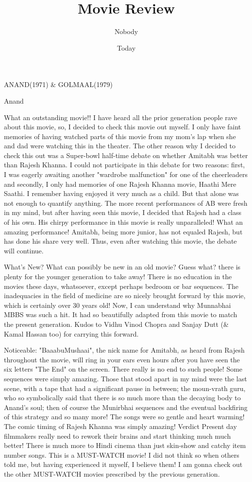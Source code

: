 \documentclass{article}
\title{Movie Review}
\author{Nobody}
\date{Today}
\begin{document}
\maketitle

\LARGE{ANAND(1971) \& GOLMAAL(1979)}

\Large{Anand}

What an outstanding movie!! I have heard all the prior generation people rave about this movie, so, I decided to check this movie out myself. I only have faint memories of having watched parts of this movie from my mom's lap when she and dad were watching this in the theater. The other reason why I decided to check this out was a Super-bowl half-time debate on whether Amitabh was better than Rajesh Khanna. I could not participate in this debate for two reasons: first, I was eagerly awaiting another "wardrobe malfunction" for one of the cheerleaders and secondly, I only had memories of one Rajesh Khanna movie, Haathi Mere Saathi. I remember having enjoyed it very much as a child. But that alone was not enough to quantify anything. The more recent performances of AB were fresh in my mind, but after having seen this movie, I decided that Rajesh had a class of his own. His chirpy performance in this movie is really unparalleled! What an amazing performance! Amitabh, being more junior, has not equaled Rajesh, but has done his share very well. Thus, even after watching this movie, the debate will continue.

What's New? What can possibly be new in an old movie? Guess what? there is plenty for the younger generation to take away! There is no education in the movies these days, whatsoever, except perhaps bedroom or bar sequences. The inadequacies in the field of medicine are so nicely brought forward by this movie, which is certainly over 30 years old! Now, I can understand why Munnabhai MBBS was such a hit. It had so beautifully adapted from this movie to match the present generation. Kudos to Vidhu Vinod Chopra and Sanjay Dutt (\& Kamal Hassan too) for carrying this forward.

Noticeable: "BaaabuMushaai", the nick name for Amitabh, as heard from Rajesh throughout the movie, will ring in your ears even hours after you have seen the six letters "The End" on the screen. There really is no end to such people! Some sequences were simply amazing. Those that stood apart in my mind were the last scene, with a tape that had a significant pause in between; the moun-vrath guru, who so symbolically said that there is so much more than the decaying body to Anand's soul; then of course the Munirbhai sequences and the eventual backfiring of this strategy and so many more! The songs were so gentle and heart warming! The comic timing of Rajesh Khanna was simply amazing! Verdict Present day filmmakers really need to rework their brains and start thinking much much better! There is much more to Hindi cinema than just skin-show and catchy item number songs. This is a MUST-WATCH movie! I did not think so when others told me, but having experienced it myself, I believe them! I am gonna check out the other MUST-WATCH movies prescribed by the previous generation. 
\end{document}
